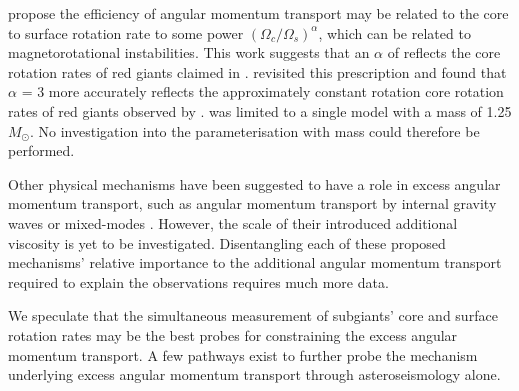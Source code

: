 \citet{spada_angular_2016} propose the efficiency of angular momentum transport may be related to the core to surface rotation rate to some power $\left(\Omega_c/\Omega_s\right)^{\alpha}$, which can be related to magnetorotational instabilities.
This work suggests that an $\alpha$ of reflects the core rotation rates of red giants claimed in \citet{mosser_spin_2012}.
\citet{moyano_asteroseismology_2022} revisited this prescription and found that $\alpha$ = 3 more accurately reflects the approximately constant rotation core rotation rates of red giants observed by \citet{gehan_core_2018}.
\citet{spada_angular_2016} was limited to a single model with a mass of 1.25 $M_{\odot}$.
No investigation into the parameterisation with mass could therefore be performed.

Other physical mechanisms have been suggested to have a role in excess angular momentum transport, such as angular momentum transport by internal gravity waves \citep{pincon_can_2017} or mixed-modes \citep{belkacem_angular_2015}. 
However, the scale of their introduced additional viscosity is yet to be investigated.
Disentangling each of these proposed mechanisms' relative importance to the additional angular momentum transport required to explain the observations requires much more data.



We speculate that the simultaneous measurement of subgiants' core and surface rotation rates may be the best probes for constraining the excess angular momentum transport.
A few pathways exist to further probe the mechanism underlying excess angular momentum transport through asteroseismology alone.

